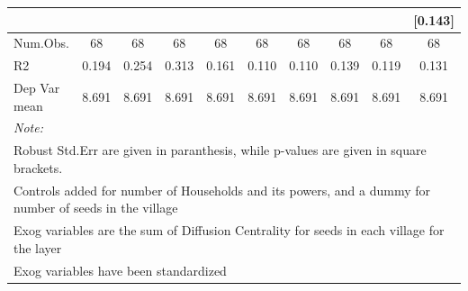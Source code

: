\begin{table}
\begin{tabular}[t]{lccccccccc}
 &  &  &  &  &  &  &  &  & {}[\num{0.143}]\\
\midrule
Num.Obs. & \num{68} & \num{68} & \num{68} & \num{68} & \num{68} & \num{68} & \num{68} & \num{68} & \num{68}\\
R2 & \num{0.194} & \num{0.254} & \num{0.313} & \num{0.161} & \num{0.110} & \num{0.110} & \num{0.139} & \num{0.119} & \num{0.131}\\
Dep Var mean & \num{8.691} & \num{8.691} & \num{8.691} & \num{8.691} & \num{8.691} & \num{8.691} & \num{8.691} & \num{8.691} & \num{8.691}\\
\bottomrule
\multicolumn{10}{l}{\rule{0pt}{1em}\textit{Note: }}\\
\multicolumn{10}{l}{\rule{0pt}{1em}Robust Std.Err are given in paranthesis, while p-values are given in square brackets.}\\
\multicolumn{10}{l}{\rule{0pt}{1em}Controls added for number of Households and its powers, and a dummy for number of seeds in the village}\\
\multicolumn{10}{l}{\rule{0pt}{1em}Exog variables are the sum of Diffusion Centrality for seeds in each village for the layer}\\
\multicolumn{10}{l}{\rule{0pt}{1em}Exog variables have been standardized}\\
\end{tabular}
\end{table}
